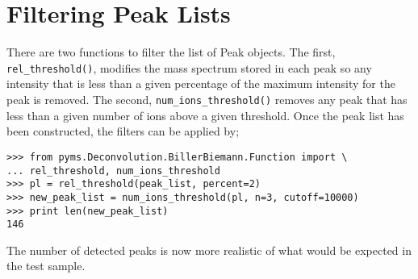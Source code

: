 \section{Filtering Peak Lists}


There are two functions to filter the list of Peak objects. The first, {\tt
rel\_threshold()}, modifies the mass spectrum stored in each peak so any
intensity that is less than a given percentage of the maximum intensity for the
peak is removed. The second, {\tt num\_ions\_threshold()} removes any peak that
has less than a given number of ions above a given threshold. Once the peak
list has been constructed, the filters can be applied by;

\begin{verbatim}
>>> from pyms.Deconvolution.BillerBiemann.Function import \
... rel_threshold, num_ions_threshold
>>> pl = rel_threshold(peak_list, percent=2)
>>> new_peak_list = num_ions_threshold(pl, n=3, cutoff=10000)
>>> print len(new_peak_list)
146
\end{verbatim}

The number of detected peaks is now more realistic of what would be expected in
the test sample.